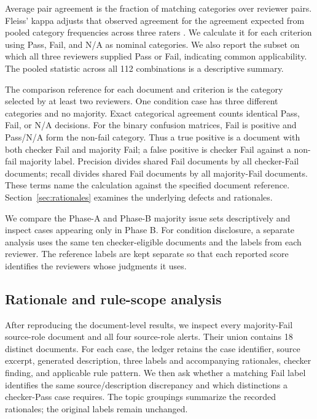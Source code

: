 \documentclass[a4paper,fleqn]{cas-dc}
\begin{document}
Average pair agreement is the fraction of matching categories over reviewer pairs. Fleiss' kappa adjusts that observed agreement for the agreement expected from pooled category frequencies across three raters \citep{Fleiss1971}. We calculate it for each criterion using Pass, Fail, and N/A as nominal categories. We also report the subset on which all three reviewers supplied Pass or Fail, indicating common applicability. The pooled statistic across all 112 combinations is a descriptive summary.

The comparison reference for each document and criterion is the category selected by at least two reviewers. One condition case has three different categories and no majority. Exact categorical agreement counts identical Pass, Fail, or N/A decisions. For the binary confusion matrices, Fail is positive and Pass/N/A form the non-fail category. Thus a true positive is a document with both checker Fail and majority Fail; a false positive is checker Fail against a non-fail majority label. Precision divides shared Fail documents by all checker-Fail documents; recall divides shared Fail documents by all majority-Fail documents. These terms name the calculation against the specified document reference. Section~\ref{sec:rationales} examines the underlying defects and rationales.

We compare the Phase-A and Phase-B majority issue sets descriptively and inspect cases appearing only in Phase B. For condition disclosure, a separate analysis uses the same ten checker-eligible documents and the labels from each reviewer. The reference labels are kept separate so that each reported score identifies the reviewers whose judgments it uses.

\subsection{Rationale and rule-scope analysis}
\label{sec:rationale-method}
After reproducing the document-level results, we inspect every majority-Fail source-role document and all four source-role alerts. Their union contains 18 distinct documents. For each case, the ledger retains the case identifier, source excerpt, generated description, three labels and accompanying rationales, checker finding, and applicable rule pattern. We then ask whether a matching Fail label identifies the same source/description discrepancy and which distinctions a checker-Pass case requires. The topic groupings summarize the recorded rationales; the original labels remain unchanged.
\end{document}
